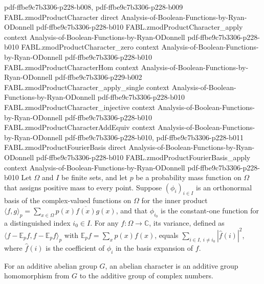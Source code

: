 \begin{theorem}
  {pdf-ffbe9c7b3306-p228-b008,
    pdf-ffbe9c7b3306-p228-b009}
\proofstep
  {FABL.zmodProductCharacter}
  {direct}
  {Analysis-of-Boolean-Functions-by-Ryan-ODonnell}
  {pdf-ffbe9c7b3306-p228-b010}
\proofstep
  {FABL.zmodProductCharacter_apply}
  {context}
  {Analysis-of-Boolean-Functions-by-Ryan-ODonnell}
  {pdf-ffbe9c7b3306-p228-b010}
\proofstep
  {FABL.zmodProductCharacter_zero}
  {context}
  {Analysis-of-Boolean-Functions-by-Ryan-ODonnell}
  {pdf-ffbe9c7b3306-p228-b010}
\proofstep
  {FABL.zmodProductCharacterHom}
  {context}
  {Analysis-of-Boolean-Functions-by-Ryan-ODonnell}
  {pdf-ffbe9c7b3306-p229-b002}
\proofstep
  {FABL.zmodProductCharacter_apply_single}
  {context}
  {Analysis-of-Boolean-Functions-by-Ryan-ODonnell}
  {pdf-ffbe9c7b3306-p228-b010}
\proofstep
  {FABL.zmodProductCharacter_injective}
  {context}
  {Analysis-of-Boolean-Functions-by-Ryan-ODonnell}
  {pdf-ffbe9c7b3306-p228-b010}
\proofstep
  {FABL.zmodProductCharacterAddEquiv}
  {context}
  {Analysis-of-Boolean-Functions-by-Ryan-ODonnell}
  {pdf-ffbe9c7b3306-p228-b010,
    pdf-ffbe9c7b3306-p228-b011}
\proofstep
  {FABL.zmodProductFourierBasis}
  {direct}
  {Analysis-of-Boolean-Functions-by-Ryan-ODonnell}
  {pdf-ffbe9c7b3306-p228-b010}
\proofstep
  {FABL.zmodProductFourierBasis_apply}
  {context}
  {Analysis-of-Boolean-Functions-by-Ryan-ODonnell}
  {pdf-ffbe9c7b3306-p228-b010}
Let $\Omega$ and $I$ be finite sets, and let $p$ be a probability mass function on
$\Omega$ that assigns positive mass to every point. Suppose $(\phi_i)_{i\in I}$ is an
orthonormal basis of the complex-valued functions on $\Omega$ for the inner product
$\langle f,g\rangle_p=\sum_{x\in\Omega}p(x)\overline{f(x)}g(x)$, and that $\phi_{i_0}$
is the constant-one function for a distinguished index $i_0\in I$. For any
$f:\Omega\to\mathbb C$, its variance, defined as $\langle f-\mathbb E_p f,f-\mathbb E_p
f\rangle_p$ with $\mathbb E_p f=\sum_xp(x)f(x)$, equals $\sum_{i\in I,\ i\ne
i_0}|\widehat f(i)|^2$, where $\widehat f(i)$ is the coefficient of $\phi_i$ in the
basis expansion of $f$.
\end{theorem}

\begin{definition}
\label{FABL.AbelianCharacter}
\leanok
For an additive abelian group $G$, an abelian character is an additive group
homomorphism from $G$ to the additive group of complex numbers.
\end{definition}


